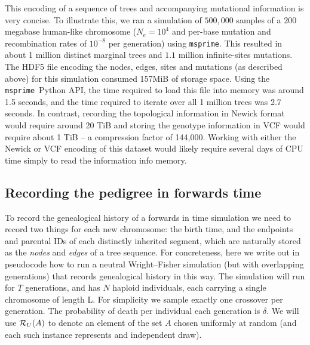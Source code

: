 \documentclass{article}
\newcommand{\msprime}{\texttt{msprime}}
\begin{document}
This encoding of a sequence of trees and accompanying mutational information is
very concise. To illustrate this, we ran a simulation of $500,000$ samples of a
$200$ megabase human-like chromosome ($N_e=10^4$ and per-base mutation and
recombination rates of $10^{-8}$ per generation) using \msprime. This resulted
in about 1 million distinct marginal trees and $1.1$ million infinite-sites
mutations. The HDF5 file encoding the nodes, edges, sites and mutations (as
described above) for this simulation consumed 157MiB of storage space. Using
the \msprime\ Python API, the time required to load this file into memory was
around 1.5 seconds, and the time required to iterate over all 1 million trees
was 2.7 seconds. In contrast, recording the topological information in Newick
format would require around 20 TiB and storing the genotype information
in VCF would require about 1 TiB --
a compression factor of 144,000.
Working with either the Newick or VCF encoding
of this dataset would likely require several
days of CPU time simply to read the information info memory.


\subsection*{Recording the pedigree in forwards time}

To record the genealogical history of a forwards in time simulation
we need to record two things for each new chromosome:
the birth time, and the endpoints and parental IDs of each distinctly inherited segment,
which are naturally stored as the \emph{nodes} and \emph{edges} of a tree sequence.
For concreteness, here we write out in pseudocode how to run a neutral Wright--Fisher simulation
(but with overlapping generations) that records genealogical history in this way.
The simulation will run for $T$ generations,
and has $N$ haploid individuals, each carrying a single chromosome of length L.
For simplicity we sample exactly one crossover per generation.
The probability of death per individual each generation is $\delta$.
We will use
$\mathcal{R}_U(A)$ to denote an element of the set $A$ chosen uniformly at random
(and each such instance represents and independent draw).
\end{document}

